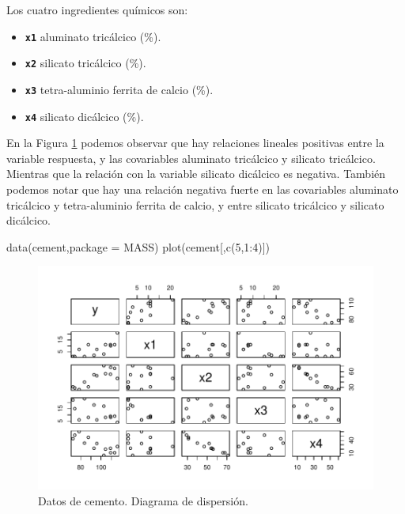 \documentclass[
]{article}
\newenvironment{Shaded}{\begin{snugshade}}{\end{snugshade}}
\newcommand{\AttributeTok}[1]{\textcolor[rgb]{0.77,0.63,0.00}{#1}}
\newcommand{\DecValTok}[1]{\textcolor[rgb]{0.00,0.00,0.81}{#1}}
\newcommand{\FunctionTok}[1]{\textcolor[rgb]{0.00,0.00,0.00}{#1}}
\newcommand{\NormalTok}[1]{#1}
\newcommand{\SpecialCharTok}[1]{\textcolor[rgb]{0.00,0.00,0.00}{#1}}
\newcommand{\StringTok}[1]{\textcolor[rgb]{0.31,0.60,0.02}{#1}}
\providecommand{\tightlist}{%
  \setlength{\itemsep}{0pt}\setlength{\parskip}{0pt}}
\begin{document}
Los cuatro ingredientes químicos son:

\begin{itemize}
\tightlist
\item
  \textbf{\texttt{x1}} aluminato tricálcico (\%).
\item
  \textbf{\texttt{x2}} silicato tricálcico (\%).
\item
  \textbf{\texttt{x3}} tetra-aluminio ferrita de calcio (\%).
\item
  \textbf{\texttt{x4}} silicato dicálcico (\%).
\end{itemize}

En la Figura \ref{fig:CementFigure} podemos observar que hay relaciones lineales positivas entre la variable respuesta, y las covariables aluminato tricálcico y silicato tricálcico. Mientras que la relación con la variable silicato dicálcico es negativa. También podemos notar que hay una relación negativa fuerte en las covariables aluminato tricálcico y tetra-aluminio ferrita de calcio, y entre silicato tricálcico y silicato dicálcico.

\begin{Shaded}
\begin{Highlighting}[]
\FunctionTok{data}\NormalTok{(cement,}\AttributeTok{package =} \StringTok{\textquotesingle{}MASS\textquotesingle{}}\NormalTok{)}
\FunctionTok{plot}\NormalTok{(cement[,}\FunctionTok{c}\NormalTok{(}\DecValTok{5}\NormalTok{,}\DecValTok{1}\SpecialCharTok{:}\DecValTok{4}\NormalTok{)])}
\end{Highlighting}
\end{Shaded}

\begin{figure}

{\centering \includegraphics{MLG2_files/figure-latex/CementFigure-1} 

}

\caption{Datos de cemento. Diagrama de dispersión.}\label{fig:CementFigure}
\end{figure}
\end{document}

